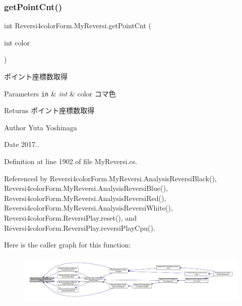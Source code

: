 \subsubsection{\texorpdfstring{get\+Point\+Cnt()}{getPointCnt()}}
{\footnotesize\ttfamily int Reversi4color\+Form.\+My\+Reversi.\+get\+Point\+Cnt (\begin{DoxyParamCaption}\item[{int}]{color }\end{DoxyParamCaption})}



ポイント座標数取得 


\begin{DoxyParams}[1]{Parameters}
\mbox{\tt in}  & {\em int} & color コマ色 \\
\hline
\end{DoxyParams}
\begin{DoxyReturn}{Returns}
ポイント座標数取得 
\end{DoxyReturn}
\begin{DoxyAuthor}{Author}
Yuta Yoshinaga 
\end{DoxyAuthor}
\begin{DoxyDate}{Date}
2017.. 
\end{DoxyDate}


Definition at line 1902 of file My\+Reversi.\+cs.



Referenced by Reversi4color\+Form.\+My\+Reversi.\+Analysis\+Reversi\+Black(), Reversi4color\+Form.\+My\+Reversi.\+Analysis\+Reversi\+Blue(), Reversi4color\+Form.\+My\+Reversi.\+Analysis\+Reversi\+Red(), Reversi4color\+Form.\+My\+Reversi.\+Analysis\+Reversi\+White(), Reversi4color\+Form.\+Reversi\+Play.\+reset(), and Reversi4color\+Form.\+Reversi\+Play.\+reversi\+Play\+Cpu().

Here is the caller graph for this function\+:\nopagebreak
\begin{figure}[H]
\begin{center}
\leavevmode
\includegraphics[width=350pt]{class_reversi4color_form_1_1_my_reversi_a64db9e5d07901c13e985e1730816bb25_icgraph}
\end{center}
\end{figure}
\mbox{\label{class_reversi4color_form_1_1_my_reversi_afdfd5f0fc3a4ed4e24bcf67ead0bb980}} 
